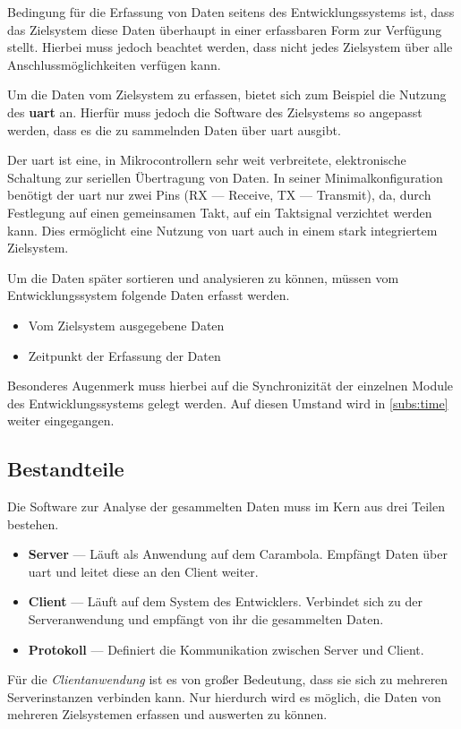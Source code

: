 Bedingung für die Erfassung von Daten seitens des Entwicklungssystems ist, dass
das Zielsystem diese Daten überhaupt in einer erfassbaren Form zur Verfügung
stellt. Hierbei muss jedoch beachtet werden, dass nicht jedes Zielsystem über
alle Anschlussmöglichkeiten verfügen kann.

Um die Daten vom Zielsystem zu erfassen, bietet sich zum Beispiel die Nutzung
des \textbf{\gls{uart}} an. Hierfür muss jedoch die Software des Zielsystems so
angepasst werden, dass es die zu sammelnden Daten über \gls{uart} ausgibt.

\begin{definition}[UART]
Der \gls{uart} ist eine, in Mikrocontrollern sehr weit verbreitete,
elektronische Schaltung zur seriellen Übertragung von Daten. In
seiner Minimalkonfiguration benötigt der \gls{uart} nur zwei Pins (RX ---
Receive, TX --- Transmit), da, durch Festlegung auf einen gemeinsamen Takt, auf
ein Taktsignal verzichtet werden kann. Dies ermöglicht eine Nutzung von
\gls{uart} auch in einem stark integriertem Zielsystem.
\end{definition}

\begin{minipage}[c]{\textwidth}
Um die Daten später sortieren und analysieren zu können, müssen vom
Entwicklungssystem folgende Daten erfasst werden.
\begin{itemize}
  \item Vom Zielsystem ausgegebene Daten
  \item Zeitpunkt der Erfassung der Daten
\end{itemize}
\end{minipage}

Besonderes Augenmerk muss hierbei auf die Synchronizität der einzelnen Module
des Entwicklungssystems gelegt werden. Auf diesen Umstand wird in
\autoref{subs:time} weiter eingegangen. 

\subsection{Bestandteile}\label{subs:best}
\begin{minipage}[c]{\textwidth}
Die Software zur Analyse der gesammelten Daten muss im Kern aus drei Teilen
bestehen.
\begin{itemize}
  \item \textbf{Server} --- Läuft als Anwendung auf dem Carambola. Empfängt
  Daten über \gls{uart} und leitet diese an den Client weiter.
  \item \textbf{Client} --- Läuft auf dem System des Entwicklers. Verbindet sich
  zu der Serveranwendung und empfängt von ihr die gesammelten Daten.
  \item \textbf{Protokoll} --- Definiert die Kommunikation zwischen Server und
  Client.
\end{itemize}
\end{minipage}\par
Für die \emph{Clientanwendung} ist es von großer Bedeutung, dass sie sich zu
mehreren Serverinstanzen verbinden kann. Nur hierdurch wird es möglich, die
Daten von mehreren Zielsystemen erfassen und auswerten zu können.

